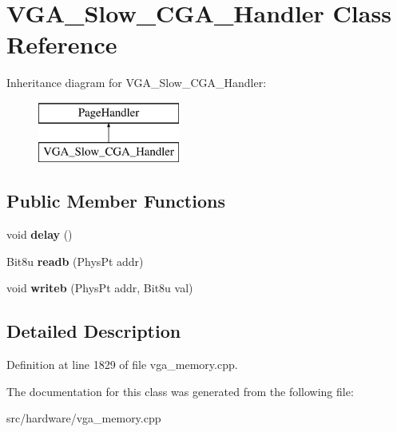 \hypertarget{classVGA__Slow__CGA__Handler}{\section{V\-G\-A\-\_\-\-Slow\-\_\-\-C\-G\-A\-\_\-\-Handler Class Reference}
\label{classVGA__Slow__CGA__Handler}
}
Inheritance diagram for V\-G\-A\-\_\-\-Slow\-\_\-\-C\-G\-A\-\_\-\-Handler\-:\begin{figure}[H]
\begin{center}
\leavevmode
\includegraphics[height=2.000000cm]{classVGA__Slow__CGA__Handler}
\end{center}
\end{figure}
\subsection*{Public Member Functions}
\begin{DoxyCompactItemize}
\item 
\hypertarget{classVGA__Slow__CGA__Handler_af8dd584b1fbb765acffe039b47f21181}{void {\bfseries delay} ()}\label{classVGA__Slow__CGA__Handler_af8dd584b1fbb765acffe039b47f21181}

\item 
\hypertarget{classVGA__Slow__CGA__Handler_a013a051c8b1dd2bc43ee85988988c077}{Bit8u {\bfseries readb} (Phys\-Pt addr)}\label{classVGA__Slow__CGA__Handler_a013a051c8b1dd2bc43ee85988988c077}

\item 
\hypertarget{classVGA__Slow__CGA__Handler_a7d713dfb7609910d40e7eed87b6002ae}{void {\bfseries writeb} (Phys\-Pt addr, Bit8u val)}\label{classVGA__Slow__CGA__Handler_a7d713dfb7609910d40e7eed87b6002ae}

\end{DoxyCompactItemize}


\subsection{Detailed Description}


Definition at line 1829 of file vga\-\_\-memory.\-cpp.



The documentation for this class was generated from the following file\-:\begin{DoxyCompactItemize}
\item 
src/hardware/vga\-\_\-memory.\-cpp\end{DoxyCompactItemize}
